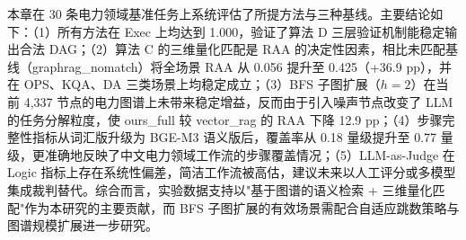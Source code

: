 本章在 30 条电力领域基准任务上系统评估了所提方法与三种基线。主要结论如下：（1）所有方法在 Exec 上均达到 1.000，验证了算法 D 三层验证机制能稳定输出合法 DAG；（2）算法 C 的三维量化匹配是 RAA 的决定性因素，相比未匹配基线（graphrag\_nomatch）将全场景 RAA 从 0.056 提升至 0.425（+36.9 pp），并在 OPS、KQA、DA 三类场景上均稳定成立；（3）BFS 子图扩展（$h=2$）在当前 4{,}337 节点的电力图谱上未带来稳定增益，反而由于引入噪声节点改变了 LLM 的任务分解粒度，使 ours\_full 较 vector\_rag 的 RAA 下降 12.9 pp；（4）步骤完整性指标从词汇版升级为 BGE-M3 语义版后，覆盖率从 0.18 量级提升至 0.77 量级，更准确地反映了中文电力领域工作流的步骤覆盖情况；（5）LLM-as-Judge 在 Logic 指标上存在系统性偏差，简洁工作流被高估，建议未来以人工评分或多模型集成裁判替代。综合而言，实验数据支持以"基于图谱的语义检索 + 三维量化匹配"作为本研究的主要贡献，而 BFS 子图扩展的有效场景需配合自适应跳数策略与图谱规模扩展进一步研究。
